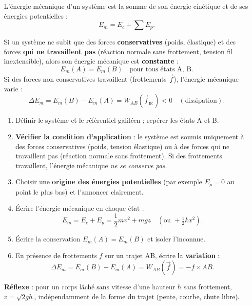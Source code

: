 \documentclass[11pt]{article}
\begin{document}
\begin{definition}
L'énergie mécanique d'un système est la somme de son énergie cinétique et de ses énergies potentielles :
\[ E_m = E_c + \sum E_p. \]
\end{definition}

\begin{propriete}
Si un système ne subit que des forces \textbf{conservatives} (poids, élastique) et des forces \textbf{qui ne travaillent pas} (réaction normale sans frottement, tension fil inextensible), alors son énergie mécanique est \textbf{constante} :
\[ E_m(A) = E_m(B) \quad \text{pour tous états A, B.} \]
Si des forces non conservatives travaillent (frottements $\vec{f}$), l'énergie mécanique varie :
\[ \Delta E_m = E_m(B) - E_m(A) = W_{AB}(\vec{f}_{\text{nc}}) < 0 \quad (\text{dissipation}). \]
\end{propriete}

\begin{methode}
\begin{enumerate}
\item Définir le système et le référentiel galiléen ; repérer les états A et B.
\item \textbf{Vérifier la condition d'application} : le système est soumis uniquement à des forces conservatives (poids, tension élastique) ou à des forces qui ne travaillent pas (réaction normale sans frottement). Si des frottements travaillent, l'énergie mécanique \emph{ne se conserve pas}.
\item Choisir une \textbf{origine des énergies potentielles} (par exemple $E_p = 0$ au point le plus bas) et l'annoncer clairement.
\item Écrire l'énergie mécanique en chaque état :
\[ E_m = E_c + E_p = \frac{1}{2}mv^2 + mgz \quad (\text{ou } + \tfrac{1}{2}kx^2). \]
\item Écrire la conservation $E_m(A) = E_m(B)$ et isoler l'inconnue.
\item En présence de frottements $f$ sur un trajet AB, écrire la \textbf{variation} :
\[ \Delta E_m = E_m(B) - E_m(A) = W_{AB}(\vec{f}) = -f \times AB. \]
\end{enumerate}
\textbf{Réflexe} : pour un corps lâché sans vitesse d'une hauteur $h$ sans frottement, $v = \sqrt{2gh}$, indépendamment de la forme du trajet (pente, courbe, chute libre).
\end{methode}
\end{document}
